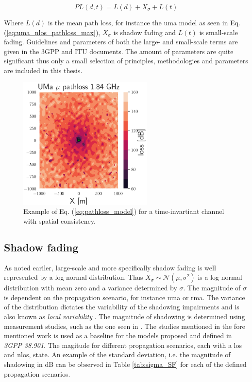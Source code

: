 \begin{equation}\label{eq:pathloss_model}
  PL(d,t) = L(d) + X_\sigma + L(t)
\end{equation}

Where $L(d)$ is the mean path loss, for instance the \gls{uma} model as seen in Eq. (\ref{eq:uma_nlos_pathloss_max}), $X_\sigma$ is shadow fading and $L(t)$ is small-scale fading. Guidelines and parameters of both the large- and small-scale terms are given in the 3GPP and ITU documents. The amount of parameters are quite significant thus only a small selection of principles, methodologies and parameters are included in this thesis. 

\begin{figure}
    \centering
    \includegraphics[width=0.6\textwidth]{chapters/part_pathloss/figures/UMaPL.eps}
    \caption{Example of Eq. (\ref{eq:pathloss_model}) for a time-invartiant channel with spatial consistency.}
\end{figure}


\subsection{Shadow fading}

As noted eariler, large-scale and more specifically shadow fading is well represented by a log-normal distribution. Thus $X_\sigma \sim \mathcal{N}(\mu, \sigma^2)$ is a log-normal distribution with mean zero and a variance determined by $\sigma$. The magnitude of $\sigma$ is dependent on the propagation scenario, for instance \gls{uma} or \gls{rma}. The variance of the distribution dictates the variability of the shadowing impairments and is also known as \emph{local variability} \cite{Perez-Fontan2008}. The magnitude of shadowing is determined using measurement studies, such as the one seen in \cite{Sun2016}. The studies mentioned in the fore mentioned work is used as a baseline for the models proposed and defined in \textit{3GPP 38.901}. The magitude for different propagation scenarios, each with a \gls{los} and \gls{nlos}, state. An example of the standard deviation, i.e. the magnitude of shadowing in dB can be observed in Table \ref{tab:sigma_SF} for each of the defined propagation scenarios.


